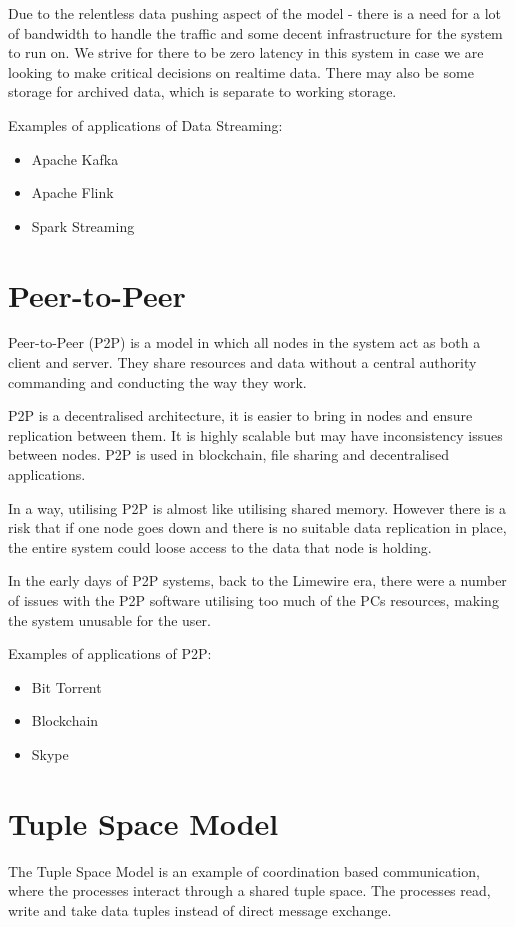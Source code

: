Due to the relentless data pushing aspect of the model - there is a need for a lot of bandwidth to handle the traffic and some decent infrastructure for the system to run on. We strive for there to be zero latency in this system in case we are looking to make critical decisions on realtime data. There may also be some storage for archived data, which is separate to working storage.

Examples of applications of Data Streaming:
\begin{itemize}
    \item Apache Kafka
    \item Apache Flink
    \item Spark Streaming
\end{itemize}

\section{Peer-to-Peer}
Peer-to-Peer (P2P) is a model in which all nodes in the system act as both a client and server. They share resources and data without a central authority commanding and conducting the way they work. 

P2P is a decentralised architecture, it is easier to bring in nodes and ensure replication between them. It is highly scalable but may have inconsistency issues between nodes. P2P is used in blockchain, file sharing and decentralised applications.

In a way, utilising P2P is almost like utilising shared memory. However there is a risk that if one node goes down and there is no suitable data replication in place, the entire system could loose access to the data that node is holding. 

In the early days of P2P systems, back to the Limewire era, there were a number of issues with the P2P software utilising too much of the PCs resources, making the system unusable for the user. 

Examples of applications of P2P:
\begin{itemize}
    \item Bit Torrent
    \item Blockchain
    \item Skype
\end{itemize}

\section{Tuple Space Model}
The Tuple Space Model is an example of coordination based communication, where the processes interact through a shared tuple space. The processes read, write and take data tuples instead of direct message exchange. 

